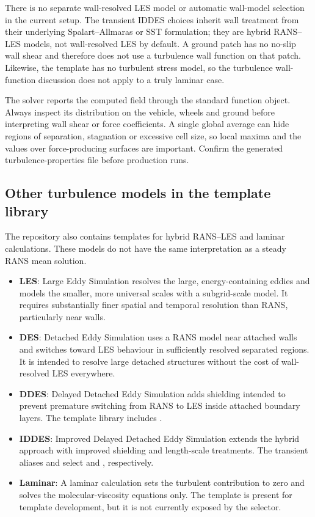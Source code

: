 There is no separate wall-resolved LES model or automatic wall-model selection in the current setup. The transient IDDES choices inherit wall treatment from their underlying Spalart--Allmaras or SST formulation; they are hybrid RANS--LES models, not wall-resolved LES by default. A  ground patch has no no-slip wall shear and therefore does not use a turbulence wall function on that patch. Likewise, the  template has no turbulent stress model, so the turbulence wall-function discussion does not apply to a truly laminar case.

The solver reports the computed  field through the standard function object. Always inspect its distribution on the vehicle, wheels and ground before interpreting wall shear or force coefficients. A single global average can hide regions of separation, stagnation or excessive cell size, so local maxima and the values over force-producing surfaces are important. Confirm the generated turbulence-properties file before production runs.

\subsection{Other turbulence models in the template library}

The repository also contains templates for hybrid RANS--LES and laminar calculations. These models do not have the same interpretation as a steady RANS mean solution.

\begin{itemize}
    \item \textbf{LES}: Large Eddy Simulation resolves the large, energy-containing eddies and models the smaller, more universal scales with a subgrid-scale model. It requires substantially finer spatial and temporal resolution than RANS, particularly near walls.
    \item \textbf{DES}: Detached Eddy Simulation uses a RANS model near attached walls and switches toward LES behaviour in sufficiently resolved separated regions. It is intended to resolve large detached structures without the cost of wall-resolved LES everywhere.
    \item \textbf{DDES}: Delayed Detached Eddy Simulation adds shielding intended to prevent premature switching from RANS to LES inside attached boundary layers. The template library includes .
    \item \textbf{IDDES}: Improved Delayed Detached Eddy Simulation extends the hybrid approach with improved shielding and length-scale treatments. The transient aliases  and  select  and , respectively.
    \item \textbf{Laminar}: A laminar calculation sets the turbulent contribution to zero and solves the molecular-viscosity equations only. The  template is present for template development, but it is not currently exposed by the  selector.
\end{itemize}

